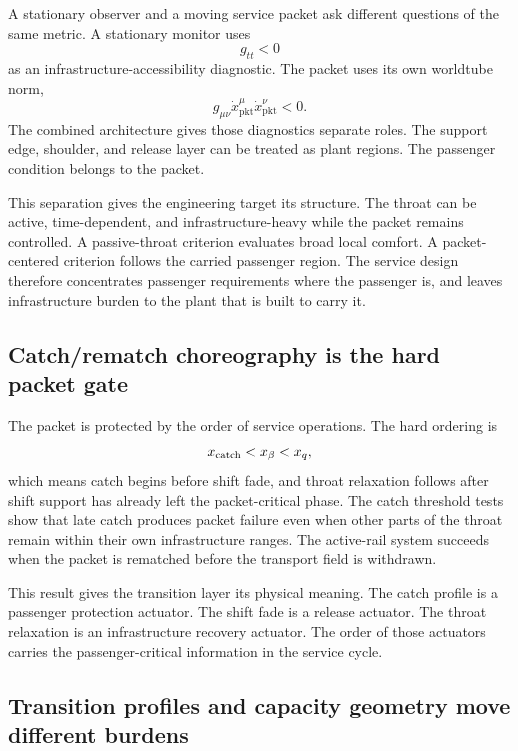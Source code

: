 \documentclass[11pt]{article}
\newcommand{\pkt}{\mathrm{pkt}}
\begin{document}
A stationary observer and a moving service packet ask different questions of the same metric. A stationary monitor uses
\begin{equation}
g_{tt}<0
\end{equation}
as an infrastructure-accessibility diagnostic. The packet uses its own worldtube norm,
\begin{equation}
g_{\mu\nu}\dot{x}_{\pkt}^{\mu}\dot{x}_{\pkt}^{\nu}<0.
\end{equation}
The combined architecture gives those diagnostics separate roles. The support edge, shoulder, and release layer can be treated as plant regions. The passenger condition belongs to the packet.

This separation gives the engineering target its structure. The throat can be active, time-dependent, and infrastructure-heavy while the packet remains controlled. A passive-throat criterion evaluates broad local comfort. A packet-centered criterion follows the carried passenger region. The service design therefore concentrates passenger requirements where the passenger is, and leaves infrastructure burden to the plant that is built to carry it.

\subsection{Catch/rematch choreography is the hard packet gate}

The packet is protected by the order of service operations. The hard ordering is
\begin{equation}
x_{\rm catch}<x_\beta<x_q,
\end{equation}
which means catch begins before shift fade, and throat relaxation follows after shift support has already left the packet-critical phase. The catch threshold tests show that late catch produces packet failure even when other parts of the throat remain within their own infrastructure ranges. The active-rail system succeeds when the packet is rematched before the transport field is withdrawn.

This result gives the transition layer its physical meaning. The catch profile is a passenger protection actuator. The shift fade is a release actuator. The throat relaxation is an infrastructure recovery actuator. The order of those actuators carries the passenger-critical information in the service cycle.

\subsection{Transition profiles and capacity geometry move different burdens}
\end{document}
